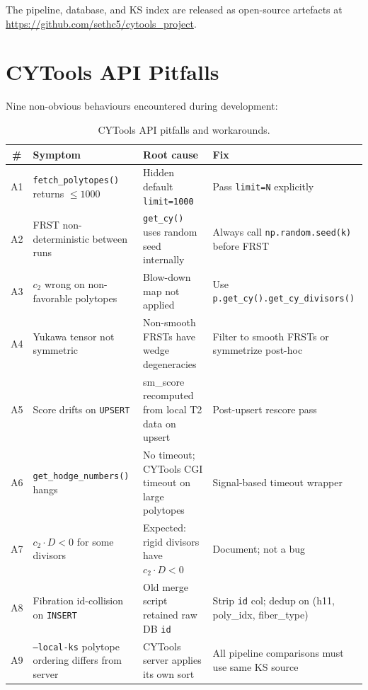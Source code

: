 \documentclass[11pt,a4paper]{article}
\begin{document}
\noindent
The pipeline, database, and KS index are released as
open-source artefacts at \url{https://github.com/sethc5/cytools_project}.

\appendix

\section{CYTools API Pitfalls}
\label{app:pitfalls}

Nine non-obvious behaviours encountered during development:

\begin{table}[H]
\centering
\caption{CYTools API pitfalls and workarounds.}
\label{tab:pitfalls}
\small
\begin{tabular}{cllp{5.5cm}}
\toprule
\# & Symptom & Root cause & Fix \\
\midrule
A1 & \texttt{fetch\_polytopes()} returns $\leq 1000$
   & Hidden default \texttt{limit=1000}
   & Pass \texttt{limit=N} explicitly \\
A2 & FRST non-deterministic between runs
   & \texttt{get\_cy()} uses random seed internally
   & Always call \texttt{np.random.seed(k)} before FRST \\
A3 & $c_2$ wrong on non-favorable polytopes
   & Blow-down map not applied
   & Use \texttt{p.get\_cy().get\_cy\_divisors()} \\
A4 & Yukawa tensor not symmetric
   & Non-smooth FRSTs have wedge degeneracies
   & Filter to smooth FRSTs or symmetrize post-hoc \\
A5 & Score drifts on \texttt{UPSERT}
   & sm\_score recomputed from local T2 data on upsert
   & Post-upsert rescore pass \\
A6 & \texttt{get\_hodge\_numbers()} hangs
   & No timeout; CYTools CGI timeout on large polytopes
   & Signal-based timeout wrapper \\
A7 & $c_2\cdot D < 0$ for some divisors
   & Expected: rigid divisors have $c_2\cdot D < 0$
   & Document; not a bug \\
A8 & Fibration id-collision on \texttt{INSERT}
   & Old merge script retained raw DB \texttt{id}
   & Strip \texttt{id} col; dedup on (h11, poly\_idx, fiber\_type) \\
A9 & \texttt{--local-ks} polytope ordering differs from server
   & CYTools server applies its own sort
   & All pipeline comparisons must use same KS source \\
\bottomrule
\end{tabular}
\end{table}
\end{document}
